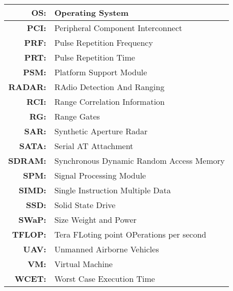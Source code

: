 \begin{center}
\begin{longtable}{|>{\bfseries}rl|}
OS: & Operating System \\ \hline
PCI: & Peripheral Component Interconnect \\ \hline
PRF: & Pulse Repetition Frequency  \\ \hline
PRT: & Pulse Repetition Time \\ \hline
PSM: & Platform Support Module \\ \hline
RADAR: & RAdio Detection And Ranging \\ \hline 
RCI: & Range Correlation Information \\ \hline
RG: & Range Gates \\ \hline
SAR: & Synthetic Aperture Radar \\ \hline
SATA: & Serial AT Attachment \\ \hline
SDRAM: & Synchronous Dynamic Random Access Memory  \\ \hline
SPM: & Signal Processing Module \\ \hline
SIMD: & Single Instruction Multiple Data \\ \hline
SSD: & Solid State Drive \\ \hline
SWaP: & Size Weight and Power \\ \hline
TFLOP: & Tera FLoting point OPerations per second \\ \hline
UAV: & Unmanned Airborne Vehicles \\ \hline 
VM: & Virtual Machine \\ \hline
WCET: &  Worst Case Execution Time \\ \hline

\end{longtable}
\end{center}
